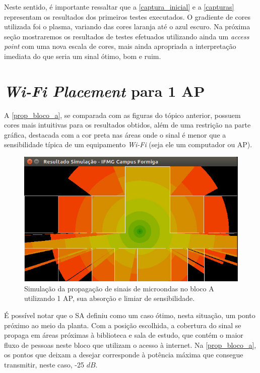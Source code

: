\documentclass[
	12pt,				%
	twoside,			%
	a4paper,			%
	english,			%
	french,				%
	spanish,			%
	brazil				%
	]{abntex2}
\begin{document}
Neste sentido, é importante ressaltar que a \autoref{captura_inicial} e
a \autoref{capturas} representam os resultados dos primeiros testes
executados. O gradiente de cores utilizada foi o plasma, variando das
cores laranja até o azul escuro. Na próxima seção mostraremos os
resultados de testes efetuados utilizando ainda um \emph{access point}
com uma nova escala de cores, mais ainda apropriada a interpretação
imediata do que seria um sinal ótimo, bom e ruim.

\section{\texorpdfstring{\emph{Wi-Fi Placement} para 1
AP}{Wi-Fi Placement para 1 AP}}\label{wi-fi-placement-para-1-ap}

A \autoref{prop_bloco_a}, se comparada com as figuras do tópico
anterior, possuem cores mais intuitivas para os resultados obtidos, além
de uma restrição na parte gráfica, destacada com a cor preta nas áreas
onde o sinal é menor que a sensibilidade típica de um equipamento
\emph{Wi-Fi} (seja ele um computador ou AP).

\begin{figure}[ht]
    \caption{\label{prop_bloco_a} Simulação da propagação de sinais de microondas no bloco A utilizando 1 AP, sua absorção e limiar de sensibilidade.}
    \begin{center}
        \includegraphics[scale=0.7]{imagens/prop-bloco-a-2.jpg}
    \end{center}
\end{figure}

É possível notar que o SA definiu como um caso ótimo, nesta situação, um
ponto próximo ao meio da planta. Com a posição escolhida, a cobertura do
sinal se propaga em áreas próximas à biblioteca e sala de estudo, que
contém o maior fluxo de pessoas neste bloco que utilizam o acesso à
internet. Na \autoref{prop_bloco_a}, os pontos que deixam a desejar
corresponde à potência máxima que consegue transmitir, neste caso, -25
\(dB\).
\end{document}
